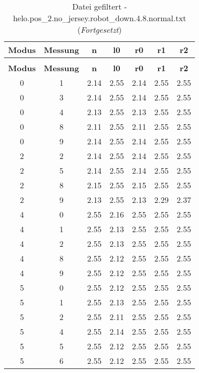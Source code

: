 \clearpage{}
\begin{longtable}{|c|c||c||c||c|c|c|}
	\caption{Datei gefiltert - helo.pos\_2.no\_jersey.robot\_down.4.8.normal.txt} \label{tab:helo.pos-2.no-jersey.robot-down.4.8.normal.txt} \\ \hline
	\textbf{Modus} & \textbf{Messung} & \textbf{n} & \textbf{l0} & \textbf{r0} & \textbf{r1} & \textbf{r2}\\ \hline
	\endfirsthead
	\caption[]{Datei gefiltert - helo.pos\_2.no\_jersey.robot\_down.4.8.normal.txt (\emph{Fortgesetzt})} \\ \hline
	\textbf{Modus} & \textbf{Messung} & \textbf{n} & \textbf{l0} & \textbf{r0} & \textbf{r1} & \textbf{r2}\\ \hline
	\endhead
	0 & 1 & 2.14 & 2.55 & 2.14 & 2.55 & 2.55 \\ \hline
	0 & 3 & 2.14 & 2.55 & 2.14 & 2.55 & 2.55 \\ \hline
	0 & 4 & 2.13 & 2.55 & 2.13 & 2.55 & 2.55 \\ \hline
	0 & 8 & 2.11 & 2.55 & 2.11 & 2.55 & 2.55 \\ \hline
	0 & 9 & 2.14 & 2.55 & 2.14 & 2.55 & 2.55 \\ \hline
	2 & 2 & 2.14 & 2.55 & 2.14 & 2.55 & 2.55 \\ \hline
	2 & 5 & 2.14 & 2.55 & 2.14 & 2.55 & 2.55 \\ \hline
	2 & 8 & 2.15 & 2.55 & 2.15 & 2.55 & 2.55 \\ \hline
	2 & 9 & 2.13 & 2.55 & 2.13 & 2.29 & 2.37 \\ \hline
	4 & 0 & 2.55 & 2.16 & 2.55 & 2.55 & 2.55 \\ \hline
	4 & 1 & 2.55 & 2.13 & 2.55 & 2.55 & 2.55 \\ \hline
	4 & 2 & 2.55 & 2.13 & 2.55 & 2.55 & 2.55 \\ \hline
	4 & 8 & 2.55 & 2.12 & 2.55 & 2.55 & 2.55 \\ \hline
	4 & 9 & 2.55 & 2.12 & 2.55 & 2.55 & 2.55 \\ \hline
	5 & 0 & 2.55 & 2.12 & 2.55 & 2.55 & 2.55 \\ \hline
	5 & 1 & 2.55 & 2.13 & 2.55 & 2.55 & 2.55 \\ \hline
	5 & 2 & 2.55 & 2.11 & 2.55 & 2.55 & 2.55 \\ \hline
	5 & 4 & 2.55 & 2.14 & 2.55 & 2.55 & 2.55 \\ \hline
	5 & 5 & 2.55 & 2.12 & 2.55 & 2.55 & 2.55 \\ \hline
	5 & 6 & 2.55 & 2.12 & 2.55 & 2.55 & 2.55 \\ \hline

\end{longtable}
